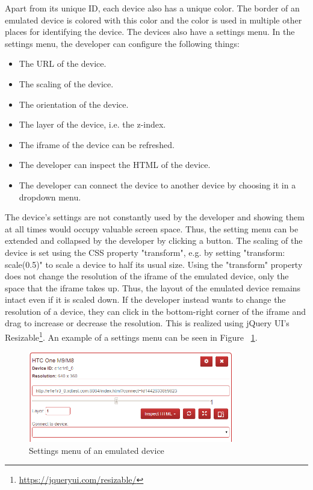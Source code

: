 Apart from its unique ID, each device also has a unique color. The border of an emulated device is colored with this color and the color is used in multiple other places for identifying the device. The devices also have a settings menu. In the settings menu, the developer can configure the following things:
\begin{itemize}
	\item The URL of the device.
	\item The scaling of the device.
	\item The orientation of the device.
	\item The layer of the device, i.e. the z-index. 
	\item The iframe of the device can be refreshed.
	\item The developer can inspect the HTML of the device.
	\item The developer can connect the device to another device by choosing it in a dropdown menu.
\end{itemize}
The device's settings are not constantly used by the developer and showing them at all times would occupy valuable screen space. Thus, the setting menu can be extended and collapsed by the developer by clicking a button. The scaling of the device is set using the CSS property "transform", e.g. by setting "transform: scale(0.5)" to scale a device to half its usual size. Using the "transform" property does not change the resolution of the iframe of the emulated device, only the space that the iframe takes up. Thus, the layout of the emulated device remains intact even if it is scaled down. If the developer instead wants to change the resolution of a device, they can click in the bottom-right corner of the iframe and drag to increase or decrease the resolution. This is realized using jQuery UI's Resizable\footnote{\url{https://jqueryui.com/resizable/}}. An example of a settings menu can be seen in Figure ~\ref{fig:settings_menu}. 

\begin{figure}[H]
  \centering
    \includegraphics[width=0.8\textwidth]{images/screenshots/settings_menu_2.png}
	\caption{Settings menu of an emulated device}
	\label{fig:settings_menu}
\end{figure}

